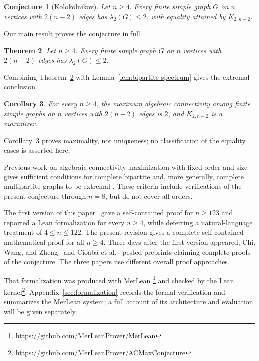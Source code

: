 \documentclass[11pt]{article}
\numberwithin{equation}{section}
\newtheorem{theorem}{Theorem}[section]
\newtheorem{corollary}[theorem]{Corollary}
\newtheorem{conjecture}[theorem]{Conjecture}
\theoremstyle{definition}
\theoremstyle{remark}
\newcommand{\ac}{\lambda_2}
\begin{document}
\begin{conjecture}[Kolokolnikov]
\label{conj:kolokolnikov}
Let \(n\ge4\).  Every finite simple graph \(G\) on \(n\) vertices
with \(2(n-2)\) edges has \(\ac(G)\le2\), with equality attained by
\(K_{2,n-2}\).
\end{conjecture}

Our main result proves the conjecture in full.

\begin{theorem}\label{thm:main}
Let \(n\ge4\).  Every finite simple graph \(G\) on \(n\) vertices
with \(2(n-2)\) edges has \(\ac(G)\le2\).
\end{theorem}

\begin{samepage}
Combining Theorem~\ref{thm:main} with
Lemma~\ref{lem:bipartite-spectrum} gives the extremal conclusion.

\begin{corollary}\label{cor:extremal}
For every \(n\ge4\), the maximum algebraic connectivity among finite
simple graphs on \(n\) vertices with \(2(n-2)\) edges is \(2\), and
\(K_{2,n-2}\) is a maximizer.
\end{corollary}
\end{samepage}

Corollary~\ref{cor:extremal} proves maximality, not uniqueness; no
classification of the equality cases is asserted here.

Previous work on algebraic-connectivity maximization with fixed order and size
gives sufficient conditions for complete bipartite and, more generally,
complete multipartite graphs to be extremal
\cite{ogiwara2017maximizing,shahbaz2023algebraic}.  These criteria include
verifications of the present conjecture through \(n=8\), but do not cover all
orders.

The first version of this paper~\cite{zhu2026largeorder} gave a self-contained
proof for \(n\ge123\) and reported a Lean formalization for every \(n\ge4\),
while deferring a natural-language treatment of \(4\le n\le122\).  The present
revision gives a complete self-contained mathematical proof for all \(n\ge4\).
Three days after the first version appeared, Chi, Wang, and
Zheng~\cite{chi2026kolokolnikov} and Cioabă et
al.~\cite{cioaba2026kolokolnikov} posted preprints claiming complete proofs of
the conjecture.  The three papers use different overall proof approaches.

That formalization was produced with MerLean \cite{li2026merleanproverrecursiveloopingharness,ren2026merleanagenticframeworkautoformalization}%
\footnote{\url{https://github.com/MerLeanProver/MerLean}} and checked by the
Lean kernel\footnote{\url{https://github.com/MerLeanProver/ACMaxConjecture}}.
Appendix~\ref{sec:formalization} records the formal verification and summarizes
the MerLean system; a full account of its architecture and evaluation will be
given separately.
\end{document}
